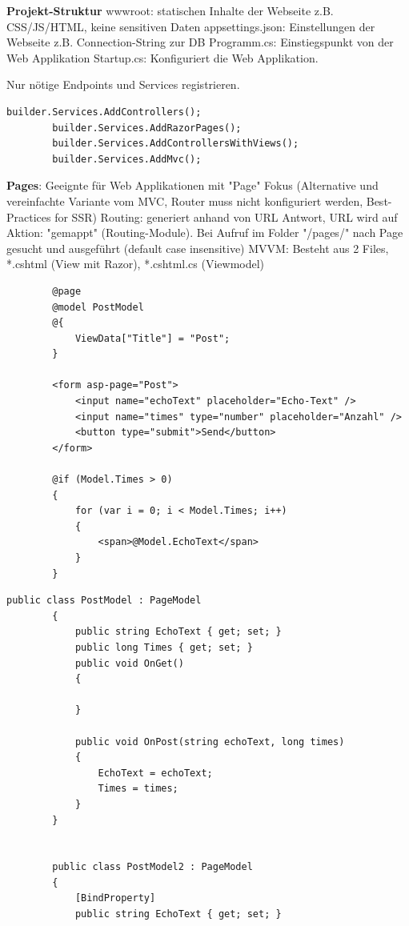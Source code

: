 \documentclass[10pt,landscape]{article}
\begin{document}
\begin{multicols}{2}
        \textbf{Projekt-Struktur}
        wwwroot: statischen Inhalte der Webseite z.B. CSS/JS/HTML, keine sensitiven Daten
        appsettings.json: Einstellungen der Webseite z.B. Connection-String zur DB
        Programm.cs: Einstiegspunkt von der Web Applikation
        Startup.cs: Konfiguriert die Web Applikation.

        Nur nötige Endpoints und Services registrieren.

        \begin{lstlisting}[style=CSharp]
        builder.Services.AddControllers();
        builder.Services.AddRazorPages();
        builder.Services.AddControllersWithViews();
        builder.Services.AddMvc();
        \end{lstlisting}

        \textbf{Pages}: Geeignte für Web Applikationen mit "Page" Fokus (Alternative und vereinfachte Variante vom MVC, Router muss nicht konfiguriert werden, Best-Practices for SSR)
        Routing: generiert anhand von URL Antwort, URL wird auf Aktion: "gemappt" (Routing-Module). Bei Aufruf im Folder "/pages/" nach Page gesucht und ausgeführt (default case insensitive)
        MVVM: Besteht aus 2 Files, *.cshtml (View mit Razor), *.cshtml.cs (Viewmodel)
        \begin{lstlisting}
        @page
        @model PostModel
        @{
            ViewData["Title"] = "Post";
        }

        <form asp-page="Post">
            <input name="echoText" placeholder="Echo-Text" />
            <input name="times" type="number" placeholder="Anzahl" />
            <button type="submit">Send</button>
        </form>

        @if (Model.Times > 0)
        {
            for (var i = 0; i < Model.Times; i++)
            {
                <span>@Model.EchoText</span>
            }
        }
        \end{lstlisting}\begin{lstlisting}[style=CSharp]
        public class PostModel : PageModel
        {
            public string EchoText { get; set; }
            public long Times { get; set; }
            public void OnGet()
            {

            }   

            public void OnPost(string echoText, long times)
            {
                EchoText = echoText;
                Times = times;            
            }
        }


        public class PostModel2 : PageModel
        {
            [BindProperty]
            public string EchoText { get; set; }


\end{lstlisting}
\end{multicols}
\end{document}
